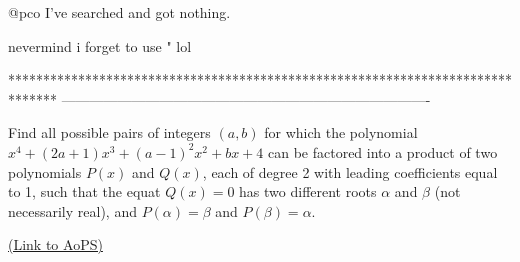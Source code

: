 \begin{solution}
	@pco I've searched and got nothing.
\end{solution}






\begin{solution}
	nevermind i forget to use " lol
\end{solution}
*******************************************************************************
-------------------------------------------------------------------------------

\begin{problem}
	Find all possible pairs of integers $(a,b)$ for which the polynomial $x^4+(2a+1)x^3+(a-1)^2x^2+bx+4$ can be factored into a product of two polynomials $P(x)$ and $Q(x)$, each of degree 2 with leading coefficients equal to 1, such that the equat $Q(x)=0$ has two different roots $\alpha$ and $\beta$ (not necessarily real), and $P(\alpha)=\beta$ and $P(\beta)=\alpha$.

	\flushright \href{https://artofproblemsolving.com/community/c6h1578428}{(Link to AoPS)}
\end{problem}



